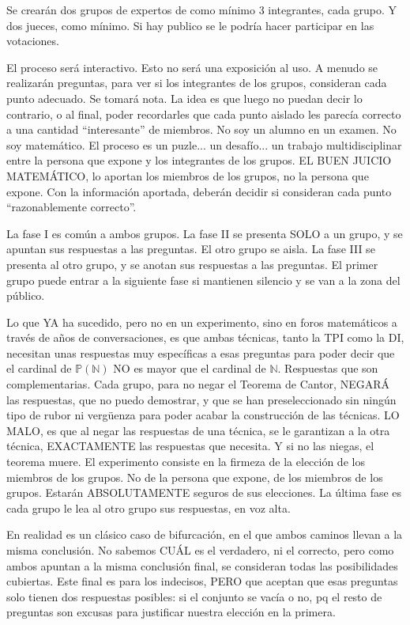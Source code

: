 \noindent
Se crearán dos grupos de expertos de como mínimo 3 integrantes, cada grupo. Y dos jueces, como mínimo. Si hay publico se le podría hacer participar en las votaciones.


\noindent
El proceso será interactivo. Esto no será una exposición al uso. A menudo se realizarán preguntas, para ver si los integrantes de los grupos, consideran cada punto adecuado. Se tomará nota. La idea es que luego no puedan decir lo contrario, o al final, poder recordarles que cada punto aislado les parecía correcto a una cantidad ``interesante'' de miembros. No soy un alumno en un examen. No soy matemático. El proceso es un puzle... un desafío... un trabajo multidisciplinar entre la persona que expone y los integrantes de los grupos. EL BUEN JUICIO MATEMÁTICO, lo aportan los miembros de los grupos, no la persona que expone. Con la información aportada, deberán decidir si consideran cada punto ``razonablemente correcto''.


\noindent
La fase I es común a ambos grupos. La fase II se presenta SOLO a un grupo, y se apuntan sus respuestas a las preguntas. El otro grupo se aisla. La fase III se presenta al otro grupo, y se anotan sus respuestas a las preguntas. El primer grupo puede entrar a la siguiente fase si mantienen silencio y se van a la zona del público.

\noindent
Lo que YA ha sucedido, pero no en un experimento, sino en foros matemáticos a través de años de conversaciones, es que ambas técnicas, tanto la TPI como la DI, necesitan unas respuestas muy específicas a esas preguntas para poder decir que el cardinal de $\mathbb{P(N)}$ NO es mayor que el cardinal de $\mathbb{N}$. Respuestas que son complementarias. Cada grupo, para no negar el Teorema de Cantor, NEGARÁ las respuestas, que no puedo demostrar, y que se han preseleccionado sin ningún tipo de rubor ni vergüenza para poder acabar la construcción de las técnicas.  LO MALO, es que al negar las respuestas de una técnica, se le garantizan a la otra técnica, EXACTAMENTE las respuestas que necesita. Y si no las niegas, el teorema muere. El experimento consiste en la firmeza de la elección de los miembros de los grupos. No de la persona que expone, de los miembros de los grupos. Estarán ABSOLUTAMENTE seguros de sus elecciones. La última fase es cada grupo le lea al otro grupo sus respuestas, en voz alta.

\noindent
En realidad es un clásico caso de bifurcación, en el que ambos caminos llevan a la misma conclusión. No sabemos CUÁL es el verdadero, ni el correcto, pero como ambos apuntan a la misma conclusión final, se consideran todas las posibilidades cubiertas. Este final es para los indecisos, PERO que aceptan que esas preguntas solo tienen dos respuestas posibles: si el conjunto se vacía o no, pq el resto de preguntas son excusas para justificar nuestra elección en la primera.

